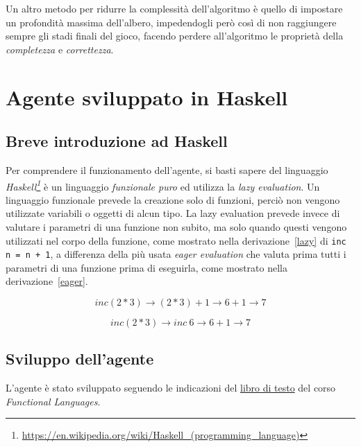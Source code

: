 \documentclass[11pt, a4paper]{article}
\begin{document}
Un altro metodo per ridurre la complessità dell'algoritmo è quello di impostare un profondità massima dell'albero, impedendogli però così di non raggiungere sempre gli stadi finali del gioco, facendo perdere all'algoritmo le proprietà della \textit{completezza} e \textit{correttezza}.

\section{Agente sviluppato in Haskell}
\subsection{Breve introduzione ad Haskell}
Per comprendere il funzionamento dell'agente, si basti sapere del linguaggio \textit{Haskell\footnote{\url{https://en.wikipedia.org/wiki/Haskell_(programming_language)}}} è un linguaggio \textit{funzionale puro} ed utilizza la \textit{lazy evaluation}. Un linguaggio funzionale prevede la creazione solo di funzioni, perciò non vengono utilizzate variabili o oggetti di alcun tipo. La lazy evaluation prevede invece di valutare i parametri di una funzione non subito, ma solo quando questi vengono utilizzati nel corpo della funzione, come mostrato nella derivazione~\ref{lazy} di \texttt{inc n = n + 1}, a differenza della più usata \textit{eager evaluation} che valuta prima tutti i parametri di una funzione prima di eseguirla, come mostrato nella derivazione~\ref{eager}.

\begin{equation}
\label{lazy}
inc (2*3) \rightarrow (2*3)+1 \rightarrow 6+1 \rightarrow 7
\end{equation}

\begin{equation}
\label{eager}
	inc (2*3) \rightarrow inc~6 \rightarrow 6+1 \rightarrow 7
\end{equation}

\subsection{Sviluppo dell'agente}
L'agente è stato sviluppato seguendo le indicazioni del \href{https://www.cs.nott.ac.uk/~pszgmh/pih.html}{libro di testo} del corso \textit{Functional Languages}.
\end{document}
